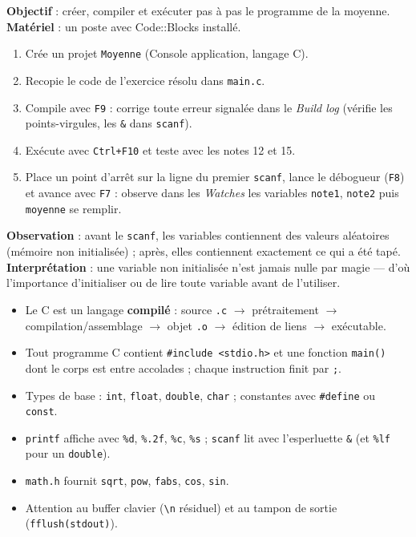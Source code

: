 \documentclass[11pt]{article}
\begin{document}
\begin{experience}
\textbf{Objectif} : créer, compiler et exécuter pas à pas le programme de la moyenne. \textbf{Matériel} : un poste avec Code::Blocks installé.
\begin{enumerate}
\item Crée un projet \texttt{Moyenne} (Console application, langage C).
\item Recopie le code de l'exercice résolu dans \texttt{main.c}.
\item Compile avec \texttt{F9} : corrige toute erreur signalée dans le \emph{Build log} (vérifie les points-virgules, les \texttt{\&} dans \texttt{scanf}).
\item Exécute avec \texttt{Ctrl+F10} et teste avec les notes 12 et 15.
\item Place un point d'arrêt sur la ligne du premier \texttt{scanf}, lance le débogueur (\texttt{F8}) et avance avec \texttt{F7} : observe dans les \emph{Watches} les variables \texttt{note1}, \texttt{note2} puis \texttt{moyenne} se remplir.
\end{enumerate}
\textbf{Observation} : avant le \texttt{scanf}, les variables contiennent des valeurs aléatoires (mémoire non initialisée) ; après, elles contiennent exactement ce qui a été tapé. \textbf{Interprétation} : une variable non initialisée n'est jamais nulle par magie — d'où l'importance d'initialiser ou de lire toute variable avant de l'utiliser.
\end{experience}

\begin{aretenir}
\begin{itemize}
\item Le C est un langage \textbf{compilé} : source \texttt{.c} $\rightarrow$ prétraitement $\rightarrow$ compilation/assemblage $\rightarrow$ objet \texttt{.o} $\rightarrow$ édition de liens $\rightarrow$ exécutable.
\item Tout programme C contient \texttt{\#include <stdio.h>} et une fonction \texttt{main()} dont le corps est entre accolades ; chaque instruction finit par \texttt{;}.
\item Types de base : \texttt{int}, \texttt{float}, \texttt{double}, \texttt{char} ; constantes avec \texttt{\#define} ou \texttt{const}.
\item \texttt{printf} affiche avec \texttt{\%d}, \texttt{\%.2f}, \texttt{\%c}, \texttt{\%s} ; \texttt{scanf} lit avec l'esperluette \texttt{\&} (et \texttt{\%lf} pour un \texttt{double}).
\item \texttt{math.h} fournit \texttt{sqrt}, \texttt{pow}, \texttt{fabs}, \texttt{cos}, \texttt{sin}.
\item Attention au buffer clavier (\texttt{\textbackslash n} résiduel) et au tampon de sortie (\texttt{fflush(stdout)}).
\end{itemize}
\end{aretenir}
\end{document}

